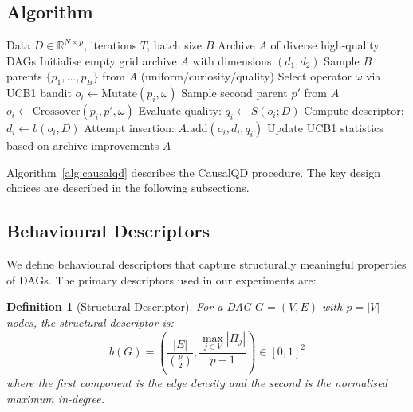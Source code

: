 \documentclass[11pt,a4paper]{article}
\newtheorem{definition}{Definition}
\begin{document}
\subsection{Algorithm}

\begin{algorithm}[t]
\caption{CausalQD MAP-Elites}
\label{alg:causalqd}
\begin{algorithmic}[1]
\REQUIRE Data $D \in \mathbb{R}^{N \times p}$, iterations $T$, batch size $B$
\ENSURE Archive $A$ of diverse high-quality DAGs
\STATE Initialise empty grid archive $A$ with dimensions $(d_1, d_2)$
    \STATE Sample $B$ parents $\{p_1, \ldots, p_B\}$ from $A$ (uniform/curiosity/quality)
        \STATE Select operator $\omega$ via UCB1 bandit
            \STATE $o_i \gets \text{Mutate}(p_i, \omega)$
        \ELSE
            \STATE Sample second parent $p'$ from $A$
            \STATE $o_i \gets \text{Crossover}(p_i, p', \omega)$
        \ENDIF
        \STATE Evaluate quality: $q_i \gets S(o_i; D)$
        \STATE Compute descriptor: $d_i \gets b(o_i, D)$
        \STATE Attempt insertion: $A.\text{add}(o_i, d_i, q_i)$
    \ENDFOR
    \STATE Update UCB1 statistics based on archive improvements
\ENDFOR
\RETURN $A$
\end{algorithmic}
\end{algorithm}

Algorithm~\ref{alg:causalqd} describes the CausalQD procedure. The key design choices are described in the following subsections.

\subsection{Behavioural Descriptors}
\label{sec:descriptors}

We define behavioural descriptors that capture structurally meaningful properties of DAGs. The primary descriptors used in our experiments are:

\begin{definition}[Structural Descriptor]
For a DAG $G = (V, E)$ with $p = |V|$ nodes, the structural descriptor is:
\begin{equation}
    b(G) = \left( \frac{|E|}{\binom{p}{2}}, \frac{\max_{j \in V} |\Pi_j|}{p - 1} \right) \in [0, 1]^2
\end{equation}
where the first component is the edge density and the second is the normalised maximum in-degree.
\end{definition}
\end{document}
